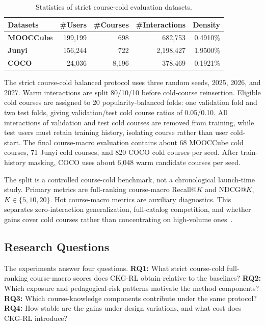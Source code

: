 \documentclass[letterpaper]{article}
\begin{document}
\begin{table}[t]
\centering
{
\small
\begin{tabular}{lrrrr}
\toprule
\textbf{Datasets} & \textbf{\#Users} & \textbf{\#Courses} & \textbf{\#Interactions} & \textbf{Density} \\
\midrule
\textbf{MOOCCube} & 199,199 & 698 & 682,753 & 0.4910\% \\
\textbf{Junyi} & 156,244 & 722 & 2,198,427 & 1.9500\% \\
\textbf{COCO} & 24,036 & 8,196 & 378,469 & 0.1921\% \\
\bottomrule
\end{tabular}
}
\caption{Statistics of strict course-cold evaluation datasets.}
\label{tab:dataset-statistics}
\end{table}

The strict course-cold balanced protocol uses three random seeds, 2025, 2026, and 2027. Warm interactions are split 80/10/10 before cold-course reinsertion. Eligible cold courses are assigned to 20 popularity-balanced folds: one validation fold and two test folds, giving validation/test cold course ratios of 0.05/0.10. All interactions of validation and test cold courses are removed from training, while test users must retain training history, isolating course rather than user cold-start. The final course-macro evaluation contains about 68 MOOCCube cold courses, 71 Junyi cold courses, and 820 COCO cold courses per seed. After train-history masking, COCO uses about 6,048 warm candidate courses per seed.

The split is a controlled course-cold benchmark, not a chronological launch-time study. Primary metrics are full-ranking course-macro Recall@\(K\) and NDCG@\(K\), \(K \in \{5,10,20\}\). Hot course-macro metrics are auxiliary diagnostics. This separates zero-interaction generalization, full-catalog competition, and whether gains cover cold courses rather than concentrating on high-volume ones~\cite{bauer2024landscape,ekstrand2024distributional}.

\subsection{Research Questions}
The experiments answer four questions. \textbf{RQ1:} What strict course-cold full-ranking course-macro scores does CKG-RL obtain relative to the baselines? \textbf{RQ2:} Which exposure and pedagogical-risk patterns motivate the method components? \textbf{RQ3:} Which course-knowledge components contribute under the same protocol? \textbf{RQ4:} How stable are the gains under design variations, and what cost does CKG-RL introduce?
\end{document}
